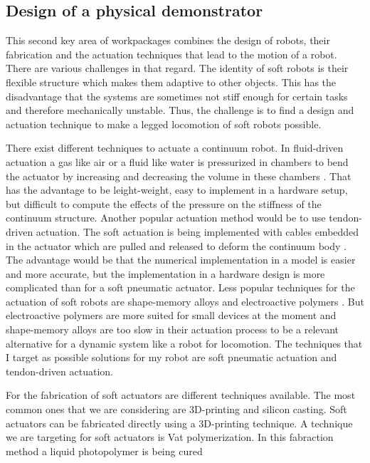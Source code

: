 \subsection*{Design of a physical demonstrator} \label{sub:Design}
%
This second key area of workpackages combines the design of robots, their fabrication and the actuation techniques that lead to the motion of a robot. There are various challenges
 in that regard. The identity of soft robots is their flexible structure which makes them adaptive to other objects. This has the disadvantage that the systems are sometimes
  not stiff enough for certain tasks
 and therefore mechanically unstable. Thus, the challenge is to find a design and actuation technique to make a legged locomotion of soft robots possible. 
 \par
There exist different techniques to actuate a continuum robot. In fluid-driven actuation a gas like air or a fluid like water is pressurized in chambers to bend the actuator
 by increasing and decreasing the volume in these chambers \cite{Polygerinos2017,Gorissen2017}. That has the advantage to be leight-weight, easy to implement in a hardware
setup, but difficult to compute the effects of the pressure on the stiffness of the continuum structure. Another popular actuation method would be to use tendon-driven actuation.
The soft actuation is being implemented with cables embedded in the actuator which are pulled and released to deform the continuum body \cite{Calisti2011,Chen2018}. 
The advantage would be that the numerical implementation in a model is easier and more accurate, but the implementation in a hardware design is
more complicated than for a soft pneumatic actuator. Less popular techniques for the actuation of soft robots are shape-memory alloys \cite{Jin2016} and electroactive
 polymers \cite{Gu2017}. But electroactive polymers are more suited for small devices at the moment and shape-memory alloys are too slow in their actuation process to be a relevant
alternative for a dynamic system like a robot for locomotion. The techniques that I target as possible solutions for my robot are soft pneumatic actuation and tendon-driven actuation.
\par
For the fabrication of soft actuators are different techniques available. The most common ones that we are considering are 3D-printing and silicon casting. Soft actuators can be
fabricated directly using a 3D-printing technique. A technique we are targeting for soft actuators is Vat polymerization. In this fabraction method a liquid photopolymer is being cured 
